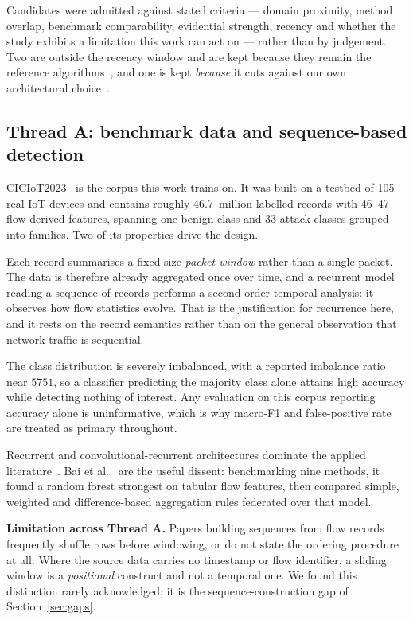 \documentclass[conference]{IEEEtran}
\begin{document}
Candidates were admitted against stated criteria --- domain proximity, method overlap,
benchmark comparability, evidential strength, recency and whether the study exhibits a limitation
this work can act on --- rather than by judgement. Two are outside the recency window and are kept
because they remain the reference algorithms~\cite{mcmahan2017fedavg,li2020fedprox}, and one is
kept \emph{because} it cuts against our own architectural choice~\cite{bai2025ietinfsec}.

\subsection{Thread A: benchmark data and sequence-based detection}
CICIoT2023~\cite{neto2023ciciot} is the corpus this work trains on. It was built on a testbed of
105 real IoT devices and contains roughly 46.7~million labelled records with 46--47 flow-derived
features, spanning one benign class and 33 attack classes grouped into families. Two of its
properties drive the design.

Each record summarises a fixed-size \emph{packet window} rather than a single packet. The data is
therefore already aggregated once over time, and a recurrent model reading a sequence of records
performs a second-order temporal analysis: it observes how flow statistics evolve. That is the
justification for recurrence here, and it rests on the record semantics rather than on the
general observation that network traffic is sequential.

The class distribution is severely imbalanced, with a reported imbalance ratio near $5751$,
so a classifier predicting the majority class alone attains high accuracy while detecting nothing
of interest. Any evaluation on this corpus reporting accuracy alone is uninformative, which is
why macro-F1 and false-positive rate are treated as primary throughout.

Recurrent and convolutional-recurrent architectures dominate the applied
literature~\cite{okey2024cnngru,bai2025ietinfsec}. Bai et al.~\cite{bai2025ietinfsec} are the useful dissent: benchmarking nine methods, it found a random forest strongest on tabular flow features,
then compared simple, weighted and difference-based aggregation rules federated over that model.

\textbf{Limitation across Thread A.} Papers building sequences from flow records frequently
shuffle rows before windowing, or do not state the ordering procedure at all. Where the source
data carries no timestamp or flow identifier, a sliding window is a \emph{positional} construct
and not a temporal one. We found this distinction rarely acknowledged; it is the
sequence-construction gap of Section~\ref{sec:gaps}.
\end{document}
